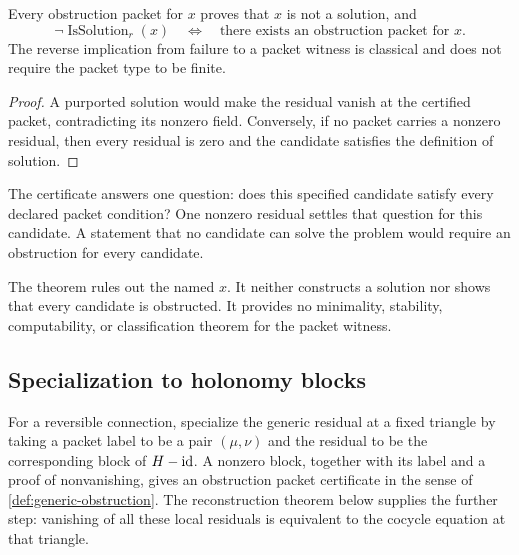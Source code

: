 \begin{theorem}
\label{thm:generic-obstruction}
Every obstruction packet for $x$ proves that $x$ is not a solution, and
\[
\neg\operatorname{IsSolution}_r(x)
\quad\Longleftrightarrow\quad
\text{there exists an obstruction packet for }x.
\]
The reverse implication from failure to a packet witness is classical and
does not require the packet type to be finite.
\end{theorem}

\begin{proof}
A purported solution would make the residual vanish at the certified packet,
contradicting its nonzero field.  Conversely, if no packet carries a nonzero
residual, then every residual is zero and the candidate satisfies the
definition of solution.
\end{proof}

\begin{interpretation}[title={What one obstruction certifies}]
The certificate answers one question: does this specified candidate satisfy
every declared packet condition?  One nonzero residual settles that question
for this candidate.  A statement that no candidate can solve the problem
would require an obstruction for every candidate.
\end{interpretation}

\begin{boundary}
The theorem rules out the named $x$.  It neither constructs a solution nor
shows that every candidate is obstructed.  It provides no minimality,
stability, computability, or classification theorem for the packet witness.
\end{boundary}

\subsection{Specialization to holonomy blocks}

For a reversible connection, specialize the generic residual at a fixed
triangle by taking a packet label to be a pair $(\mu,\nu)$ and the residual
to be the corresponding block of $H-\mathrm{id}$.  A nonzero block, together with its
label and a proof of nonvanishing, gives an obstruction packet certificate
in the sense of \cref{def:generic-obstruction}.  The reconstruction theorem
below supplies the further step: vanishing of all these local residuals is
equivalent to the cocycle equation at that triangle.

